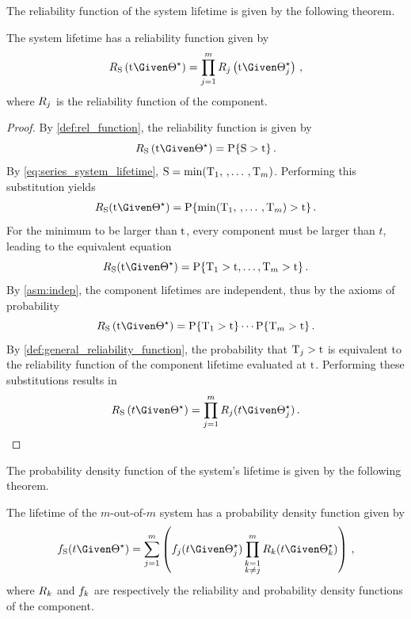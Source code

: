 \documentclass[../main.tex]{subfiles}
\begin{document}
The reliability function of the system lifetime is given by the following 
theorem.
\begin{theorem}
\label{thm:series_reliability_function}
The system lifetime has a reliability function given by
\begin{equation}
\label{eq:series_reliability_function}
    \srv_{\sv}\left(\ti \Given \tparam\sysparam\right) = \prod_{j=1}^{m} \srv_j\left(\ti \Given \tparam\sysparam_j\right)\,,
\end{equation}
where $R_j$ is the reliability function of the \jth component.
\end{theorem}
\begin{proof}
By \cref{def:rel_function}, the reliability function is given by
\begin{equation}
    \srv_{\sv}\left(\ti \Given \tparam\sysparam\right) = \Prob{\sv > \ti}\,.
\end{equation}
By \cref{eq:series_system_lifetime}, $\mathrm{S} = \min(\mathrm{T}_1,\,,\ldots\,,\mathrm{T}_m)$. Performing this substitution yields
\begin{align}
    \srv_{\sv}(\ti \Given \tparam{\sysparam}) = \Prob{\min(\cv_1,\,,\ldots\,, \cv_m) > \ti}\,.
\end{align}
For the minimum to be larger than $\mathrm{t}$, every component must be larger than $t$, leading to the equivalent equation
\begin{equation}
    \srv_{\sv}(\ti \Given \tparam{\sysparam}) = \Prob{\cv_1 > \ti, \ldots, \cv_m > \ti}\,.
\end{equation}
By \cref{asm:indep}, the component lifetimes are independent, thus by the axioms of probability
\begin{equation}
    \srv_{\sv}\left(\ti \Given \tparam{\sysparam}\right) = \Prob{\cv_1 > \ti} \cdots \Prob{\cv_m > \ti}\,.
\end{equation}
By \cref{def:general_reliability_function}, the probability that $\mathrm{T}_j > \mathrm{t}$ is equivalent to the reliability function of the \jth component lifetime evaluated at $\mathrm{t}$. Performing these substitutions results in
\begin{equation}
    \srv_{\sv}\left(t \Given \tparam{\sysparam}\right) = \prod_{j=1}^{m} \srv_j(t \Given \tparam{\sysparam}_j)\,.
\end{equation}
\end{proof}
The probability density function of the system's lifetime is given by the following theorem.
\begin{theorem}
\label{thm:series_pdf_function}
The lifetime of the $m$-out-of-$m$ system has a probability density function given by
\begin{equation}
\label{eq:series_pdf_function}
    \spdf(t \Given \tparam\sysparam) = \sum_{j=1}^{m} \left(\pdf_j(t \Given \tparam{\sysparam}_j)
    \prod_{\substack{k=1\\k \neq j}}^{m} \srv_k(t \Given \tparam{\sysparam}_k)\right )\,,
\end{equation}
where $R_k$ and $f_k$ are respectively the reliability and probability 
density functions of the \kth component.
\end{theorem}
\end{document}
